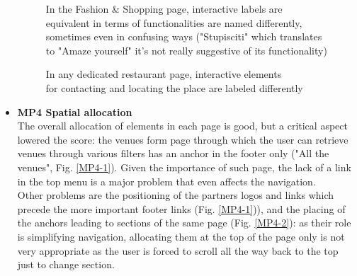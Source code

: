 \begin{itemize}
\begin{figure}[!ht]
\begin{minipage}{\linewidth}
                \captionsetup{justification=centering}
                \caption{In the Fashion \& Shopping page, interactive labels are equivalent in terms of functionalities are named differently, sometimes even in confusing ways ("Stupisciti" which translates to "Amaze yourself" it's not really suggestive of its functionality)}
                \label{MP3-1}
            \end{minipage}
        \end{figure}
        \begin{figure}[!ht]
            \begin{minipage}{\linewidth}
                \centering
                \captionsetup{justification=centering}
                \caption{In any dedicated restaurant page, interactive elements\\for contacting and locating the place are labeled differently}
                \label{MP3-2}
            \end{minipage}
        \end{figure}
        \pagebreak
    \item \textbf{MP4 Spatial allocation}\\
        The overall allocation of elements in each page is good, but a critical aspect lowered the score: the venues form page through which the user can retrieve venues through various filters has an anchor in the footer only ("All the venues", Fig. \ref{MP4-1}). Given the importance of such page, the lack of a link in the top menu is a major problem that even affects the navigation.\\
        Other problems are the positioning of the partners logos and links which precede the more important footer links (Fig. \ref{MP4-1})), and the placing of the anchors leading to sections of the same page (Fig. \ref{MP4-2}): as their role is simplifying navigation, allocating them at the top of the page only is not very appropriate as the user is forced to scroll all the way back to the top just to change section.
        \begin{figure}[!ht]

\end{figure}
\end{itemize}
